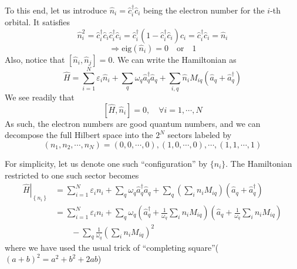 To this end, let us introduce $\hat{n}_i=\hat{c}_{i}^{\dagger}\hat{c}_i$ being the electron number for the $i$-th orbital. It satisfies
\[ \hat{n}_{i}^{2}=\hat{c}_{i}^{\dagger}\hat{c}_i\hat{c}_{i}^{\dagger}\hat{c}_i=\hat{c}_{i}^{\dagger}\left( 1-\hat{c}_{i}^{\dagger}\hat{c}_i \right) \hat{c}_i=\hat{c}_{i}^{\dagger}\hat{c}_i=\hat{n}_i\]
\[ \Rightarrow \mathrm{eig}\left( \hat{n}_i \right) =0\quad \mathrm{or}\quad 1\]
Also, notice that $\left[ \hat{n}_i,\hat{n}_j \right] =0$. We can write the Hamiltonian as
\[ \hat{H}=\sum_{i=1}^N{\varepsilon _i\hat{n}_i}+\sum_q{\omega _q\hat{a}_{q}^{\dagger}\hat{a}_q}+\sum_{i,q}{\hat{n}_iM_{iq}\left( \hat{a}_q+\hat{a}_{q}^{\dagger} \right)}\]
We see readily that
\[ \left[ \hat{H},\hat{n}_i \right] =0,\quad \forall i=1,\cdots ,N\]
As such, the electron numbers are good quantum numbers, and we can decompose the full Hilbert space into the $2^N$ sectors labeled by
\[ \left( n_1,n_2,\cdots ,n_N \right) =\left( 0,0,\cdots ,0 \right) ,\left( 1,0,\cdots ,0 \right) ,\cdots ,\left( 1,1,\cdots ,1 \right) \]

For simplicity, let us denote one such ``configuration'' by $\{n_i\}$. The Hamiltonian restricted to one such sector becomes
\begin{align*}
    \left. \hat{H} \right|_{\left\{ n_i \right\}}&=\sum_{i=1}^N{\varepsilon _in_i}+\sum_q{\omega _q\hat{a}_{q}^{\dagger}\hat{a}_q}+\sum_q{\left( \sum_i{n_iM_{iq}} \right) \left( \hat{a}_q+\hat{a}_{q}^{\dagger} \right)}\\
    &=\sum_{i=1}^N{\varepsilon _in_i}+\sum_q{\omega _q\left( \hat{a}_{q}^{\dagger}+\frac{1}{\omega _q}\sum_i{n_iM_{iq}} \right) \left( \hat{a}_q+\frac{1}{\omega _q}\sum_i{n_iM_{iq}} \right)}\\
    &\qquad-\sum_q{\frac{1}{\omega _{q}}\left( \sum_i{n_iM_{iq}} \right) ^2}
\end{align*}
where we have used the usual trick of ``completing square''($(a+b)^2=a^2+b^2+2ab$)

